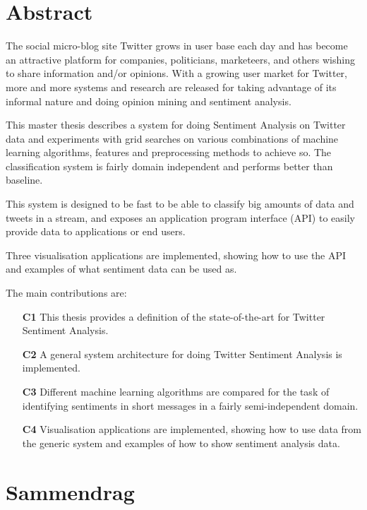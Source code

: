 \section*{Abstract}

The social micro-blog site Twitter grows in user base each day and has become an attractive platform for companies, politicians, marketeers, and others wishing to share information and/or opinions. With a growing user market for Twitter, more and more systems and research are released for taking advantage of its informal nature and doing opinion mining and sentiment analysis. 

This master thesis describes a system for doing Sentiment Analysis on Twitter data and experiments with grid searches on various combinations of machine learning algorithms, features and preprocessing methods to achieve so. The classification system is fairly domain independent and performs better than baseline. 

This system is designed to be fast to be able to classify big amounts of data and tweets in a stream, and exposes an application program interface (API) to easily provide data to applications or end users. 

Three visualisation applications are implemented, showing how to use the API and examples of what sentiment data can be used as.

The main contributions are: 

\begin{itemize}
\item[\textbf{C1}] This thesis provides a definition of the state-of-the-art for Twitter Sentiment Analysis.

\item[\textbf{C2}] A general system architecture for doing Twitter Sentiment Analysis is implemented. 

\item[\textbf{C3}] Different machine learning algorithms are compared for the task of identifying sentiments in short messages in a fairly semi-independent domain.

\item[\textbf{C4}] Visualisation applications are implemented, showing how to use data from the generic system and examples of how to show sentiment analysis data.
\end{itemize}

\clearpage

\section*{Sammendrag}

